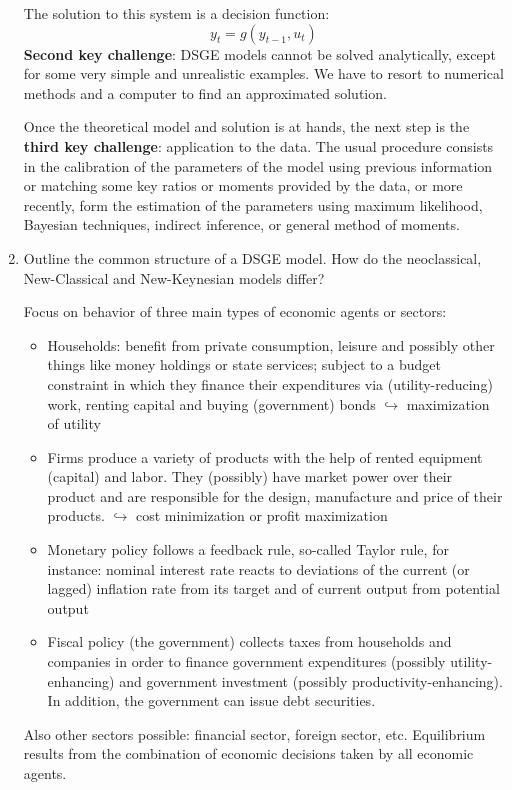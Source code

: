 \documentclass[a4paper]{scrartcl}
\begin{document}
\begin{enumerate}
\begin{solution}
	The solution to this system is a decision function:
	$$y_t = g(y_{t-1},u_t)$$ \textbf{Second key challenge}: DSGE models cannot be solved analytically, except for some very simple and unrealistic examples. We have to resort to numerical methods and a computer to find an approximated solution.
	
	Once the theoretical model and solution is at hands, the next step is the \textbf{third key challenge}: application to the data. The usual procedure consists in the calibration of the parameters of the model using previous information or matching some key ratios or moments provided by the data, or more recently, form the estimation of the parameters using maximum likelihood, Bayesian techniques, indirect inference, or general method of moments.
		

	\end{solution}
	\item Outline the common structure of a DSGE model. How do the neoclassical, New-Classical and New-Keynesian models differ?
	\begin{solution}
	Focus on behavior of three main types of economic agents or sectors: 
	\begin{itemize}
		\item Households: benefit from private consumption, leisure and possibly other things like money holdings or state services; subject to a budget constraint in which they finance their expenditures via (utility-reducing) work, renting capital and buying (government) bonds $\hookrightarrow$ maximization of utility
		\item Firms produce a variety of products with the help of rented equipment (capital) and labor. They (possibly) have market power over their product and are responsible for the design, manufacture and price of their products. $\hookrightarrow$ 
		cost minimization or profit maximization
		\item Monetary policy follows a feedback rule, so-called Taylor rule, for instance: nominal interest rate reacts to deviations of the current (or lagged) inflation rate from its target and of current output from potential output
		\item Fiscal policy (the government) collects taxes from households and companies in order to finance government expenditures (possibly utility-enhancing) and government investment (possibly productivity-enhancing). In addition, the government can issue debt securities.
		\end{itemize}
	Also other sectors possible: financial sector, foreign sector, etc. Equilibrium results from the combination of economic decisions taken by all economic agents.
	

\end{solution}
\end{enumerate}
\end{document}
